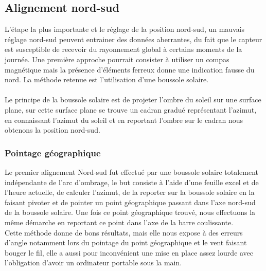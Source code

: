 \documentclass[12pt,a4paper]{article}
\begin{document}
\begin{flushleft}
\subsection{Alignement nord-sud}

L'étape la plus importante et le réglage de la position nord-sud, un mauvais réglage nord-sud peuvent entrainer des données aberrantes, du fait que le capteur est susceptible de recevoir du rayonnement global à certains moments de la journée. Une première approche pourrait consister à utiliser un compas magnétique mais la présence d'éléments ferreux donne une indication fausse du nord. La méthode retenue est l'utilisation d'une boussole solaire.\\
~~\\
Le principe de la boussole solaire est de projeter l'ombre du soleil sur une surface plane, sur cette surface plane se trouve un cadran gradué représentant l'azimut, en connaissant l'azimut du soleil et en reportant l'ombre sur le cadran nous obtenons la position nord-sud.\\

\subsubsection{Pointage géographique}

Le premier alignement Nord-sud fut effectué par une boussole solaire totalement indépendante de l'arc d'ombrage, le but consiste à l'aide d'une feuille excel et de l'heure actuelle, de calculer l'azimut, de la reporter sur la boussole solaire en la faisant pivoter et de pointer un point géographique passant dans l'axe nord-sud de la boussole solaire. Une fois ce point géographique trouvé, nous effectuons la même démarche en reportant ce point dans l'axe de la barre coulissante.\\

Cette méthode donne de bons résultats, mais elle nous expose à des erreurs d'angle notamment lors du pointage du point géographique et le vent faisant bouger le fil, elle a aussi pour inconvénient une mise en place assez lourde avec l'obligation d'avoir un ordinateur portable sous la main.\\	


\end{flushleft}
\end{document}
